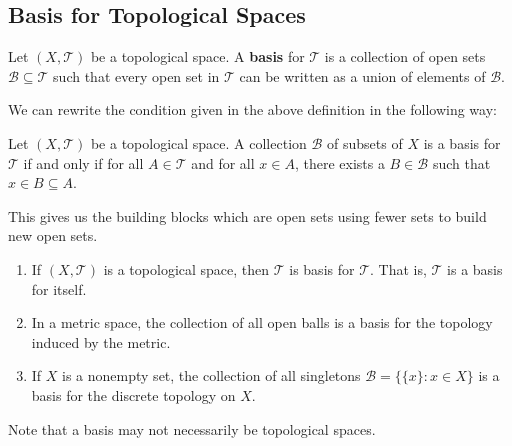 \subsection{Basis for Topological Spaces}

\begin{definition}[Basis]
    Let \( (X,\mathcal{T}) \) be a topological space. A \textbf{basis} for \( \mathcal{T} \) is a collection of open sets \( \mathcal{B} \subseteq \mathcal{T} \) such that every open set in \( \mathcal{T} \) can be written as a union of elements of \( \mathcal{B} \).
\end{definition}

\begin{remark}
    We can rewrite the condition given in the above definition in the following way: 
    \begin{center}
    Let \( (X,\mathcal{T}) \) be a topological space. A collection \( \mathcal{B} \) of subsets of \( X  \) is a basis for \( \mathcal{T} \) if and only if for all \( A \in \mathcal{T} \) and for all \( x \in A  \), there exists a \( B \in \mathcal{B} \) such that \( x \in B \subseteq A  \).
    \end{center}
\end{remark}

This gives us the building blocks which are open sets using fewer sets to build new open sets. 

\begin{eg}
   \begin{enumerate}
       \item[(a)] If \( (X,\mathcal{T}) \) is a topological space, then \( \mathcal{T} \) is basis for \( \mathcal{T} \). That is, \( \mathcal{T} \) is a basis for itself.
        \item[(b)] In a metric space, the collection of all open balls is a basis for the topology induced by the metric.
        \item[(c)] If \( X  \) is a nonempty set, the collection of all singletons \( \mathcal{B} = \{  \{ x  \}  : x \in X  \}  \) is a basis for the discrete topology on \( X  \).
   \end{enumerate} 
\end{eg}

\begin{remark}
    Note that a basis may not necessarily be topological spaces.
\end{remark}

